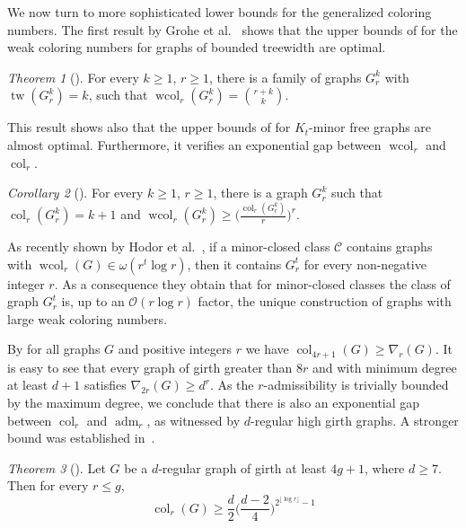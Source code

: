 \documentclass[1p,number,a4paper]{elsarticle}
\theoremstyle{remark}
\newcommand{\Oof}{\mathcal{O}}
\newcommand{\Cc}{\mathscr{C}}
\DeclareMathOperator{\col}{col}
\DeclareMathOperator{\wcol}{wcol}
\DeclareMathOperator{\adm}{adm}
\DeclareMathOperator{\tw}{tw}
\newtheorem{theorem}{Theorem}[section]
\newtheorem{corollary}[theorem]{Corollary}
\begin{document}
We now turn to more sophisticated lower bounds for the generalized coloring numbers. 
The first result by Grohe et al.~\cite{grohe2015colouring} shows that the upper bounds of  for the weak coloring numbers for graphs of bounded treewidth are optimal. 

\begin{theorem}[\cite{grohe2015colouring}]\label{thm:Gkr}
  For every $k\geq 1$, $r\geq 1$, there is a family of graphs $G^k_r$ with $\tw(G^k_r) = k$, such
  that $\wcol_{r}(G^k_r)=\binom{r+k}{k}$. 
\end{theorem}

This result shows also that the upper bounds of  for $K_t$-minor free graphs are almost optimal. Furthermore, it verifies an exponential gap between 
$\wcol_r$ and $\col_r$.


\begin{corollary}[\cite{grohe2015colouring}]\label{colgap}
  For every $k\geq 1$, $r\geq 1$, there is a graph $G^k_r$ such 
  that $\col_{r}(G^k_r)=k+1$ and $\wcol_{r}(G^k_r) \geq \big(\frac{\col_{r}(G^k_r)}{r}\big)^{r}$.
\end{corollary}

As recently shown by Hodor et al.~\cite{hodor2024weak}, if a minor-closed class $\Cc$ contains graphs with $\wcol_r(G)\in \omega(r^t\log r)$, then it contains $G_r^t$ for every non-negative integer $r$. 
As a consequence they obtain that for minor-closed classes the class of graph $G_r^t$ is, up to an $\Oof(r\log r)$ factor, the unique construction of graphs with large weak coloring numbers. 

\smallskip
By  for all graphs $G$ and positive integers $r$ we have 
$\col_{4r+1}(G) \geq \nabla_r(G)$. 
It is easy to see that every graph of girth greater than $8r$ and with minimum degree at least $d+1$ satisfies $\nabla_{2r}(G)\geq d^r$. As the $r$-admissibility is trivially bounded by the maximum degree, we conclude that there is also an exponential gap between $\col_r$ and $\adm_r$, as witnessed by $d$-regular high girth graphs. A stronger bound was established in~\cite{grohe2015colouring}. 

\begin{theorem}[\cite{grohe2015colouring}]
  Let $G$ be a $d$-regular graph of girth at least $4g+1$, where $d\geq 7$. Then for every $r\leq g$, \[\col_r(G)\geq \frac{d}{2}\big(\frac{d-2}{4}\big)^{2^{\lfloor \log r\rfloor}-1}\]
\end{theorem}
\end{document}
